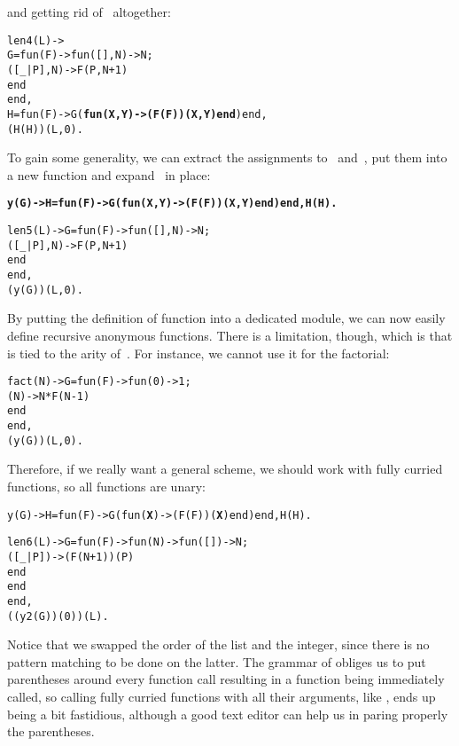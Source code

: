  and getting rid of~ altogether:
\begin{alltt}
len4(L) ->
  G = fun(F) -> fun(   [],N) -> N;
                   ([_|P],N) -> F(P,N+1)
                end
      end,
  H = fun(F) -> G(\textbf{fun(X,Y) -> (F(F))(X,Y) end}) end,
  (H(H))(L,0).
\end{alltt}
To gain some generality, we can extract the assignments to
~and~, put them into a new function
 and expand~ in place:
\begin{alltt}
\textbf{y(G) -> H=fun(F) -> G(fun(X,Y)->(F(F))(X,Y) end) end, H(H).}

len5(L) -> G = fun(F) -> fun(   [],N) -> N;
                            ([_|P],N) -> F(P,N+1)
                         end
               end,
           (y(G))(L,0).
\end{alltt}
By putting the definition of function  into a dedicated
module, we can now easily define recursive anonymous functions. There
is a limitation, though, which is that  is tied to the
arity of~. For instance, we cannot use it for the
factorial:
\begin{alltt}
fact(N) -> G = fun(F) -> fun(0) -> 1;
                            (N) -> N * F(N-1)
                         end
               end,
           (y(G))(L,0).\hfill% Arity mismatch
\end{alltt}
Therefore, if we really want a general scheme, we should work with
fully curried functions, so all functions are unary:
\begin{alltt}
y(G) -> H = fun(F) -> G(fun(\textbf{X}) -> (F(F))(\textbf{X}) end) end, H(H).

len6(L) -> G=fun(F) -> fun(N) -> fun(   []) -> N;
                                    ([_|P]) -> (F(N+1))(P)
                                 end
                       end
             end,
           ((y2(G))(0))(L).
\end{alltt}
Notice that we swapped the order of the list and the integer, since
there is no pattern matching to be done on the latter. The grammar of
\Erlang obliges us to put parentheses around every function call
resulting in a function being immediately called, so calling fully
curried functions with all their arguments, like
, ends up being a bit fastidious, although a
good text editor can help us in paring properly the parentheses.

